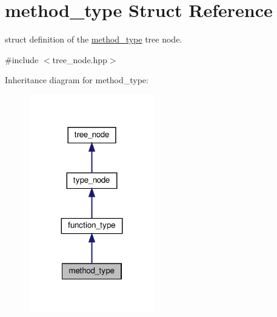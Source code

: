 \hypertarget{structmethod__type}{}\section{method\+\_\+type Struct Reference}
\label{structmethod__type}


struct definition of the \hyperlink{structmethod__type}{method\+\_\+type} tree node.  




{\ttfamily \#include $<$tree\+\_\+node.\+hpp$>$}



Inheritance diagram for method\+\_\+type\+:
\nopagebreak
\begin{figure}[H]
\begin{center}
\leavevmode
\includegraphics[width=155pt]{dd/d31/structmethod__type__inherit__graph}
\end{center}
\end{figure}


